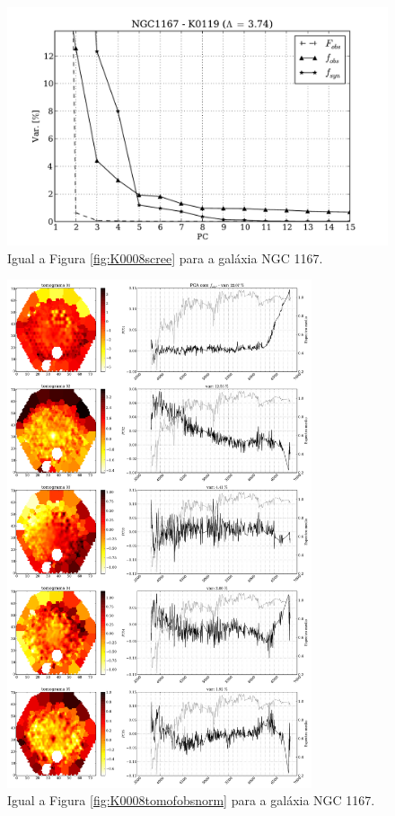 \begin{figure}
    \includegraphics[height=0.33\textheight]{figuras/K0119-screetest.pdf}
    \caption[Scree test comparativo entre 3 PCAs - NGC 1167.]
    {Igual a Figura \ref{fig:K0008scree} para a galáxia NGC 1167.}
    \label{fig:K0119scree}
\end{figure}

\begin{figure}
    \includegraphics[width=0.8\textwidth]{figuras/K0119-tomo-obs-norm.pdf}
    \caption[Tomogramas de 1 a 5 para o cubo $f_{obs}$ - NGC 1167.]
    {Igual a Figura \ref{fig:K0008tomofobsnorm} para a galáxia NGC 1167.}
    \label{fig:K0119tomofobsnorm}
\end{figure}


